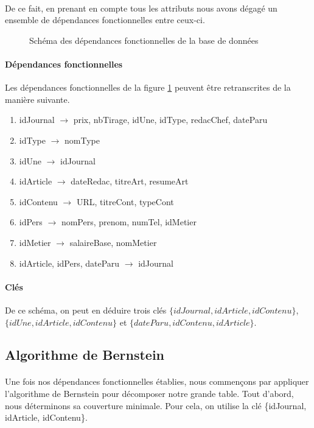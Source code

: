 \paragraph{}{De ce fait, en prenant en compte tous les attributs nous avons dégagé un ensemble de dépendances fonctionnelles entre ceux-ci.}

\begin{figure}
	\label{sch_df}
	\centering
	
	\caption{Schéma des dépendances fonctionnelles de la base de données}
\end{figure} 

\paragraph{Dépendances fonctionnelles}{Les dépendances fonctionnelles de la figure \ref{sch_df} peuvent être retranscrites de la manière suivante.
}
\begin{enumerate}
    \item[(1)] idJournal $\rightarrow$ prix, nbTirage, idUne, idType, redacChef, dateParu
    \item[(2)] idType $\rightarrow$ nomType
    \item[(3)] idUne $\rightarrow$ idJournal
    \item[(4)] idArticle $\rightarrow$ dateRedac, titreArt, resumeArt
    \item[(5)] idContenu $\rightarrow$ URL, titreCont, typeCont
    \item[(6)] idPers $\rightarrow$ nomPers, prenom, numTel, idMetier
    \item[(7)] idMetier $\rightarrow$ salaireBase, nomMetier
    \item[(8)] idArticle, idPers, dateParu $\rightarrow$ idJournal
\end{enumerate}

\paragraph{Clés}{
    De ce schéma, on peut en déduire trois clés $\{idJournal, idArticle, idContenu\}$, $\{idUne, idArticle, idContenu\}$ et $\{dateParu, idContenu, idArticle\}$.
}

\subsection{Algorithme de Bernstein}
\paragraph{}{Une fois nos dépendances fonctionnelles établies, nous commençons par appliquer l'algorithme de Bernstein pour décomposer notre grande table. Tout d'abord, nous déterminons sa couverture minimale. Pour cela, on utilise la clé \{idJournal, idArticle, idContenu\}.
}

